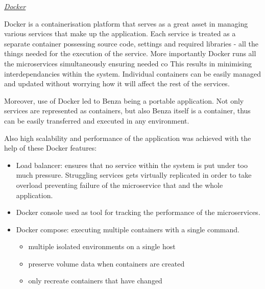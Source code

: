 \documentclass{article}
\begin{document}
    \emph{\href{https://www.docker.com/}{Docker}} \par
    
    Docker is a containerisation platform that serves as a great asset in managing various services that make up the application. Each service is treated as a separate container possessing source code, settings and required libraries - all the things needed for the execution of the service. More importantly Docker runs all the microservices simultaneously ensuring needed co
    This results in minimising interdependancies within the system. Individual containers can be easily managed and updated without worrying how it will affect the rest of the services. \par
    Moreover, use of Docker led to Benza being a portable application. Not only services are represented as containers, but also Benza itself is a container, thus can be easily transferred and executed in any environment.

    Also high scalability and performance of the application was achieved with the help of these Docker features:
 
    \begin{itemize}
        \item Load balancer: ensures that no service within the system is put under too much pressure. Struggling services gets virtually replicated in order to take overload preventing failure of the microservice that and the whole application. %
        \item Docker console used as tool for tracking the performance of the microservices.   %
        \item Docker compose: executing multiple containers with a single command. 
             \begin{itemize}
                 \item multiple isolated environments on a single host
                 \item preserve volume data when containers are created
                 \item only recreate containers that have changed %
             \end{itemize}
    \end{itemize}
   
\end{document}
